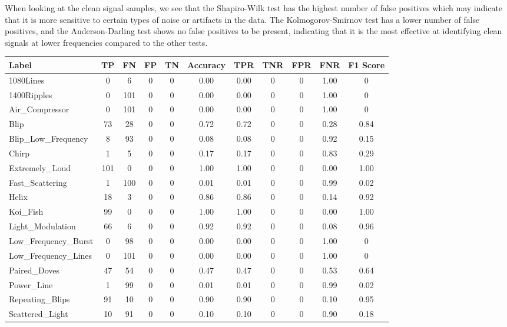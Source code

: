 \documentclass[12pt]{article}
\begin{document}
\noindent When looking at the clean signal samples, we see that the Shapiro-Wilk test has the highest number of false positives which may indicate that it is more sensitive to certain types of noise or artifacts in the data. The Kolmogorov-Smirnov test has a lower number of false positives, and the Anderson-Darling test shows no false positives to be present, indicating that it is the most effective at identifying clean signals at lower frequencies compared to the other tests.

\begin{table}[H]
  \begin{tabular}{lcccccccccc}
  \toprule
  Label & TP & FN & FP & TN & Accuracy & TPR & TNR & FPR & FNR & F1 Score \\
  \midrule
  1080Lines & 0 & 6 & 0 & 0 & 0.00 & 0.00 & 0 & 0 & 1.00 & 0 \\
  1400Ripples & 0 & 101 & 0 & 0 & 0.00 & 0.00 & 0 & 0 & 1.00 & 0 \\
  Air\_Compressor & 0 & 101 & 0 & 0 & 0.00 & 0.00 & 0 & 0 & 1.00 & 0 \\
  Blip & 73 & 28 & 0 & 0 & 0.72 & 0.72 & 0 & 0 & 0.28 & 0.84 \\
  Blip\_Low\_Frequency & 8 & 93 & 0 & 0 & 0.08 & 0.08 & 0 & 0 & 0.92 & 0.15 \\
  Chirp & 1 & 5 & 0 & 0 & 0.17 & 0.17 & 0 & 0 & 0.83 & 0.29 \\
  Extremely\_Loud & 101 & 0 & 0 & 0 & 1.00 & 1.00 & 0 & 0 & 0.00 & 1.00 \\
  Fast\_Scattering & 1 & 100 & 0 & 0 & 0.01 & 0.01 & 0 & 0 & 0.99 & 0.02 \\
  Helix & 18 & 3 & 0 & 0 & 0.86 & 0.86 & 0 & 0 & 0.14 & 0.92 \\
  Koi\_Fish & 99 & 0 & 0 & 0 & 1.00 & 1.00 & 0 & 0 & 0.00 & 1.00 \\
  Light\_Modulation & 66 & 6 & 0 & 0 & 0.92 & 0.92 & 0 & 0 & 0.08 & 0.96 \\
  Low\_Frequency\_Burst & 0 & 98 & 0 & 0 & 0.00 & 0.00 & 0 & 0 & 1.00 & 0 \\
  Low\_Frequency\_Lines & 0 & 101 & 0 & 0 & 0.00 & 0.00 & 0 & 0 & 1.00 & 0 \\
  Paired\_Doves & 47 & 54 & 0 & 0 & 0.47 & 0.47 & 0 & 0 & 0.53 & 0.64 \\
  Power\_Line & 1 & 99 & 0 & 0 & 0.01 & 0.01 & 0 & 0 & 0.99 & 0.02 \\
  Repeating\_Blips & 91 & 10 & 0 & 0 & 0.90 & 0.90 & 0 & 0 & 0.10 & 0.95 \\
  Scattered\_Light & 10 & 91 & 0 & 0 & 0.10 & 0.10 & 0 & 0 & 0.90 & 0.18 \\

\end{tabular}
\end{table}
\end{document}
